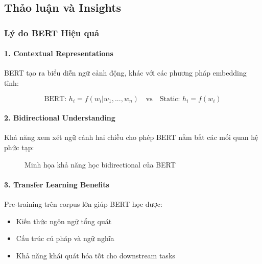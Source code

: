 \subsection{Thảo luận và Insights}
\label{ssec:thao_luan}

\subsubsection{Lý do BERT Hiệu quả}

\paragraph{1. Contextual Representations}
BERT tạo ra biểu diễn ngữ cảnh động, khác với các phương pháp embedding tĩnh:

\begin{equation}
\text{BERT: } h_i = f(w_i | w_1, ..., w_n) \quad \text{vs} \quad \text{Static: } h_i = f(w_i)
\end{equation}

\paragraph{2. Bidirectional Understanding}
Khả năng xem xét ngữ cảnh hai chiều cho phép BERT nắm bắt các mối quan hệ phức tạp:

\begin{figure}[H]
\centering
{}
\caption{Minh họa khả năng học bidirectional của BERT}
\label{fig:bidirectional}
\end{figure}

\paragraph{3. Transfer Learning Benefits}
Pre-training trên corpus lớn giúp BERT học được:
\begin{itemize}
    \item Kiến thức ngôn ngữ tổng quát
    \item Cấu trúc cú pháp và ngữ nghĩa
    \item Khả năng khái quát hóa tốt cho downstream tasks
\end{itemize}

